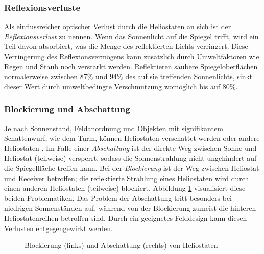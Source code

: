 \subsubsection*{Reflexionsverluste} \label{subsubsec_Reflexionsverluste}
Als einflussreicher optischer Verlust durch die Heliostaten an sich ist der \textit{Reflexionsverlust} zu nennen.
Wenn das Sonnenlicht auf die Spiegel trifft, wird ein Teil davon absorbiert, was die Menge des reflektierten Lichts verringert.
Diese Verringerung des Reflexionsvermögens kann zusätzlich durch Umweltfaktoren wie Regen und Staub noch verstärkt werden.
Reflektieren saubere Spiegeloberflächen normalerweise zwischen $87 \%$ und $94 \%$ des auf sie treffenden Sonnenlichts, sinkt dieser Wert durch umweltbedingte Verschmutzung womöglich bis auf $80 \%$. \cite[S.14]{DissBelhomme}

\subsubsection*{Blockierung und Abschattung} \label{subsubsec_blockingshading}
Je nach Sonnenstand, Feldanordnung und Objekten mit signifikantem Schattenwurf, wie dem Turm, können Heliostaten verschattet werden oder andere Heliostaten .
Im Falle einer \textit{Abschattung} ist der direkte Weg zwischen Sonne und Heliostat (teilweise) versperrt, sodass die Sonnenstrahlung nicht ungehindert auf die Spiegelfläche treffen kann.
Bei der \textit{Blockierung} ist der Weg zwischen Heliostat und Receiver betroffen; die reflektierte Strahlung eines Heliostaten wird durch einen anderen Heliostaten (teilweise) blockiert.
Abbildung \ref{fig_AbschattungBlockieren} visualisiert diese beiden Problematiken.
Das Problem der Abschattung tritt besonders bei niedrigen Sonnenständen auf, während von der Blockierung zumeist die hinteren Heliostatenreihen betroffen sind.
Durch ein geeignetes Felddesign kann diesen Verlusten entgegengewirkt werden. \cite[S.686]{Wei2010}

\begin{figure}[h!]
    \centering
    \setlength{\fboxsep}{1pt}
    \setlength{\fboxrule}{1pt}
\caption[Blockierung und Abschattung von Heliostaten]{Blockierung (links) und Abschattung (rechts) von Heliostaten \cite[S.15]{DissBelhomme}}
    \label{fig_AbschattungBlockieren}
\end{figure}

